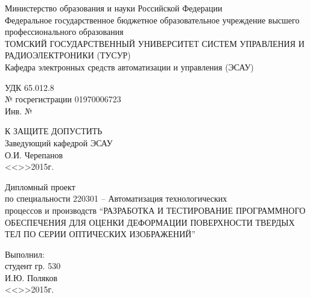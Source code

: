 \newpage
{}

\begin{center}
 Министерство образования и науки Российской Федерации\\
 Федеральное государственное бюджетное образовательное учреждение высшего профессионального образования\\
 ТОМСКИЙ ГОСУДАРСТВЕННЫЙ УНИВЕРСИТЕТ СИСТЕМ УПРАВЛЕНИЯ И РАДИОЭЛЕКТРОНИКИ (ТУСУР)\\
 Кафедра электронных средств автоматизации и управления (ЭСАУ)\\
\end{center}

\begin{minipage}{0.45\textwidth}
 \begin{flushleft}
  УДК 65.012.8 \\
  № госрегистрации 01970006723 \\
  Инв. № \\
 \end{flushleft}
\end{minipage}
\begin{minipage}{0.45\textwidth}
 \begin{flushleft}
  К ЗАЩИТЕ ДОПУСТИТЬ \\
  Заведующий кафедрой ЭСАУ \\
  \underline{\hspace{2.5cm}}О.И. Черепанов \\
  <<\underline{\hspace{1cm}}>>\underline{\hspace{3cm}}2015г.\\
 \end{flushleft}
\end{minipage}

\vspace*{1.5 cm}

\begin{center}
Дипломный проект\\
по специальности 220301 – Автоматизация технологических \\
процессов и производств
``РАЗРАБОТКА И ТЕСТИРОВАНИЕ ПРОГРАММНОГО ОБЕСПЕЧЕНИЯ ДЛЯ ОЦЕНКИ ДЕФОРМАЦИИ ПОВЕРХНОСТИ ТВЕРДЫХ ТЕЛ ПО СЕРИИ ОПТИЧЕСКИХ ИЗОБРАЖЕНИЙ''\\
\end{center}

\vspace*{1.5 cm}

\begin{flushright}
\begin{minipage}{0.45\textwidth}
 \begin{flushleft}
  Выполнил: \\
  студент гр. 530 \\
  \underline{\hspace{3cm}}И.Ю. Поляков \\
  <<\underline{\hspace{1cm}}>>\underline{\hspace{3cm}}2015г.\\
 \end{flushleft}
\end{minipage}
\end{flushright}

